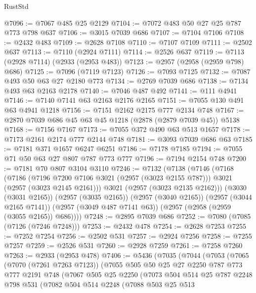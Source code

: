 \begin{lexlean}{RustStd}
\begin{coremodule}
@7096 := @7067 @485 @25 @2129
@7104 := @7072 @483 @50 @27 @25 @787 @773 @798 @637
@7106 := @3015 @7039 @686
@7107 := @7104 @7106
@7108 := @2432 @483
@7109 := @2628 @7108
@7110 := @7107 @7109
@7111 := @2502 @637
@7113 := @7110 (@2924 @7111)
@7114 := @2526 @637
@7119 := @7113 (@2928 @7114) (@2933 (@2953 @483))
@7123 := @2957 (@2958 (@2959 @798) @686)
@7125 := @7096 (@7119 @7123)
@7126 := @7093 @7125
@7132 := @7087 @493 @50 @63 @27 @2180 @773
@7134 := @2769 @7039 @686
@7138 := @7134 @493 @63 @2163 @2178
@7140 := @7046 @487 @492
@7141 := @111 @4941
@7146 := @7140 @7141 @63 @2163 @2176 @2165
@7151 := @7055 @130 @491 @63 @4941 @1218
@7156 := @7151 @2162 @2175 @777 @2134 @748
@7167 := @2870 @7039 @686 @45 @63 @45 @1218 (@2878 (@2879 @7039 @45)) @5138
@7168 := @7156 @7167
@7173 := @7055 @372 @490 @63 @513 @1657
@7178 := @7173 @2161 @2174 @777 @2144 @748
@7181 := @3093 @7039 @686 @63
@7185 := @7181 @371 @1657 @6247 @6251
@7186 := @7178 @7185
@7194 := @7055 @71 @50 @63 @27 @807 @787 @773 @777
@7196 := @7194 @2154 @748
@7200 := @7181 @70 @807 @3104 @3110
@7246 := @7132
    (@7138
      (@7146
        (@7168
          (@7186
            (@7196 @7200 @7106 @3021 (@2957 (@3023 @2155 @787)))
            @3021
            (@2957 (@3023 @2145 @2161)))
          @3021
          (@2957 (@3023 @2135 @2162)))
        (@3030 (@3031 @2165))
        (@2957 (@3035 @2165))
        (@2957 (@3040 @2165))
        (@2957 (@3044 @2165 @7141))
        (@2957 (@3049 @487 @7141 @63))
        (@2957 (@2958 (@2959 (@3055 @2165)) @686))))
@7248 := @2895 @7039 @686
@7252 := @7080 (@7085 (@7126 (@7246 @7248)))
@7253 := @2432 @478
@7254 := @2628 @7253
@7255 := @7252 @7254
@7256 := @2502 @531
@7257 := @2924 @7256
@7258 := @7255 @7257
@7259 := @2526 @531
@7260 := @2928 @7259
@7261 := @7258 @7260
@7263 := @2933 (@2953 @478)
@7406 := @5436
    (@7035
      (@7044
        (@7053
          (@7065
            (@7070 (@7261 @7263 @7123))
            (@7055
              @505
              @50
              @25
              @27
              @2250
              @787
              @773
              @777
              @2191
              @748
              (@7067
                @505
                @25
                @2250
                (@7073
                  @504
                  @514
                  @25
                  @787
                  @2248
                  @798
                  @531
                  (@7082
                    @504
                    @514
                    @2248
                    (@7088
                      @503
                      @25
                      @513

\end{coremodule}
\end{lexlean}

